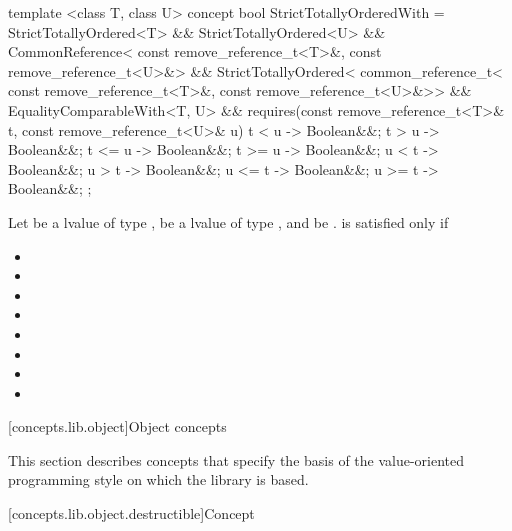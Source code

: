 \begin{itemdecl}
template <class T, class U>
concept bool StrictTotallyOrderedWith =
  StrictTotallyOrdered<T> &&
  StrictTotallyOrdered<U> &&
  CommonReference<
    const remove_reference_t<T>&,
    const remove_reference_t<U>&> &&
  StrictTotallyOrdered<
    common_reference_t<
      const remove_reference_t<T>&,
      const remove_reference_t<U>&>> &&
  EqualityComparableWith<T, U> &&
  requires(const remove_reference_t<T>& t,
           const remove_reference_t<U>& u) {
    { t < u }  -> Boolean&&;
    { t > u }  -> Boolean&&;
    { t <= u } -> Boolean&&;
    { t >= u } -> Boolean&&;
    { u < t }  -> Boolean&&;
    { u > t }  -> Boolean&&;
    { u <= t } -> Boolean&&;
    { u >= t } -> Boolean&&;
  };
\end{itemdecl}

\begin{itemdescr}
\pnum
Let  be a  lvalue of type ,
 be a  lvalue of type ,
and  be .
 is satisfied only if

\begin{itemize}
\item {}
\item {}
\item {}
\item {}
\item {}
\item {}
\item {}
\item {}
\end{itemize}
\end{itemdescr}

[concepts.lib.object]{Object concepts}

\pnum
This section describes concepts that specify the basis of the
value-oriented programming style on which the library is based.

[concepts.lib.object.destructible]{Concept }

